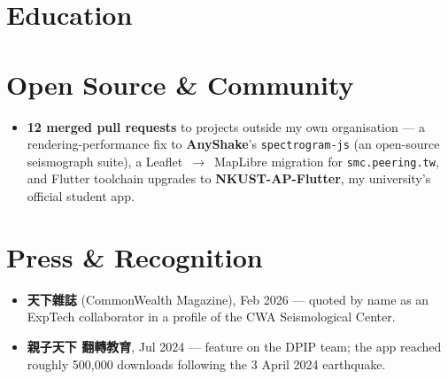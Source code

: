 \documentclass[10pt,a4paper]{article}
\begin{document}
\section{Education}

\section{Open Source \& Community}
\begin{itemize}
  \item \textbf{12 merged pull requests} to projects outside my own organisation — a rendering-performance fix to
        \textbf{AnyShake}'s \texttt{spectrogram-js} (an open-source seismograph suite), a Leaflet~$\rightarrow$~MapLibre
        migration for \texttt{smc.peering.tw}, and Flutter toolchain upgrades to \textbf{NKUST-AP-Flutter},
        my university's official student app.
\end{itemize}

\section{Press \& Recognition}
\begin{itemize}
  \item \textbf{天下雜誌} (CommonWealth Magazine), Feb 2026 — quoted by name as an ExpTech collaborator in a profile
        of the CWA Seismological Center.
  \item \textbf{親子天下 翻轉教育}, Jul 2024 — feature on the DPIP team; the app reached roughly 500,000 downloads
        following the 3 April 2024 earthquake.
\end{itemize}

\end{document}
